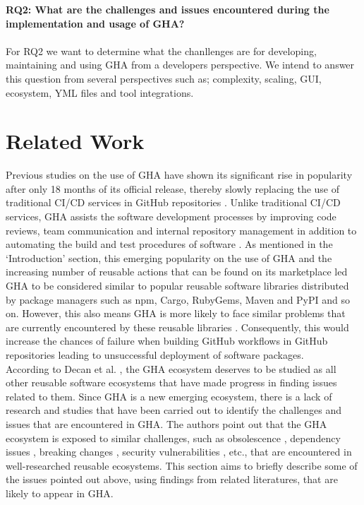 \documentclass[conference]{IEEEtran}
\begin{document}
     \textbf{RQ2: What are the challenges and issues encountered during the implementation and usage of GHA?}\\
\\
For RQ2 we want to determine what the chanllenges are for developing, maintaining and using GHA from a developers perspective. We intend to answer this question from several perspectives such as; complexity, scaling, GUI, ecosystem, YML files and tool integrations.


\section{Related Work}
Previous studies on the use of GHA have shown its significant rise in popularity after only 18 months of its official release, thereby slowly replacing the use of traditional CI/CD services in GitHub repositories \cite{golzadeh2021rise}. Unlike traditional CI/CD services, GHA assists the software development processes by improving code reviews, team communication and internal repository management in addition to automating the build and test procedures of software \cite{chandrasekara2021hands}. As mentioned in the ‘Introduction’ section, this emerging popularity on the use of GHA and the increasing number of reusable actions that can be found on its marketplace led GHA to be considered similar to popular reusable software libraries distributed by package managers such as npm, Cargo, RubyGems, Maven and PyPI and so on. However, this also means GHA is more likely to face similar problems that are currently encountered by these reusable libraries \cite{decan2022use}. Consequently, this would increase the chances of failure when building GitHub workflows in GitHub repositories leading to unsuccessful deployment of software packages. 
\\

According to Decan et al. \cite{decan2022use}, the GHA ecosystem deserves to be studied as all other reusable software ecosystems that have made progress in finding issues related to them. Since GHA is a new emerging ecosystem, there is a lack of research and studies that have been carried out to identify the challenges and issues that are encountered in GHA. The authors point out that the GHA ecosystem is exposed to similar challenges, such as obsolescence \cite{decan2018evolution} \cite{cogo2021deprecation}, dependency issues \cite{decan2019empirical} \cite{soto2021comprehensive} \cite{decan2019package}, breaking changes \cite{dietrich2019dependency}\cite{decan2018impact}, security vulnerabilities \cite{zimmermann2019small} \cite{kula2018developers}, etc., that are encountered in well-researched reusable ecosystems. This section aims to briefly describe some of the issues pointed out above, using findings from related literatures, that are likely to appear in GHA.
\end{document}
